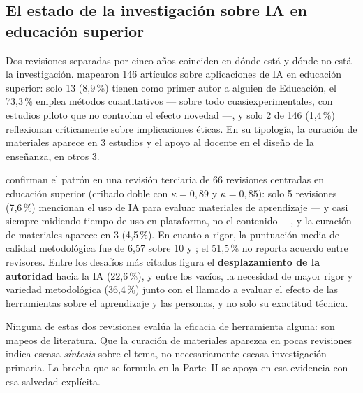 \subsection{El estado de la investigación sobre IA en educación superior}
\label{sec:contexto-aied}

Dos revisiones separadas por cinco años coinciden en dónde está y dónde no está la
investigación. \textcite{zawacki2019systematic} mapearon 146 artículos sobre
aplicaciones de IA en educación superior: solo 13 (8,9\,\%) tienen como primer autor
a alguien de Educación, el 73,3\,\% emplea métodos cuantitativos --- sobre todo
cuasiexperimentales, con estudios piloto que no controlan el efecto novedad ---, y
solo 2 de 146 (1,4\,\%) reflexionan críticamente sobre implicaciones éticas. En su
tipología, la curación de materiales aparece en 3 estudios y el apoyo al docente en
el diseño de la enseñanza, en otros 3.

\textcite{bond2024meta} confirman el patrón en una revisión terciaria de 66
revisiones centradas en educación superior (cribado doble con $\kappa = 0{,}89$ y
$\kappa = 0{,}85$): solo 5 revisiones (7,6\,\%) mencionan el uso de IA para evaluar
materiales de aprendizaje --- y casi siempre midiendo tiempo de uso en plataforma,
no el contenido ---, y la curación de materiales aparece en 3 (4,5\,\%). En cuanto a
rigor, la puntuación media de calidad metodológica fue de 6,57 sobre 10 y
; el 51,5\,\% no reporta acuerdo entre revisores.
Entre los desafíos más citados figura el \textbf{desplazamiento de la autoridad}
hacia la IA (22,6\,\%), y entre los vacíos, la necesidad de mayor rigor y variedad
metodológica (36,4\,\%) junto con el llamado a evaluar el efecto de las herramientas
sobre el aprendizaje y las personas, y no solo su exactitud técnica.

\begin{advertencia}
Ninguna de estas dos revisiones evalúa la eficacia de herramienta alguna: son mapeos
de literatura. Que la curación de materiales aparezca en pocas revisiones indica
escasa \emph{síntesis} sobre el tema, no necesariamente escasa investigación
primaria. La brecha que se formula en la Parte~II se apoya en esa evidencia con esa
salvedad explícita.
\end{advertencia}
